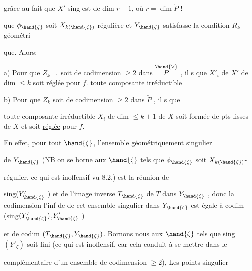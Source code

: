 

grâce au fait que $\underline{X'}$ sing est de dim $r-1$, où $r=\dim \check{P}$ !

que $\phi_{\hand{\zeta}}$ soit $X_{k(\hand{\zeta})}$-régulière et $Y_{\hand{\zeta}}$ satisfasse la condition $R_k$ géométri-%

que. Alors:

a) Pour que $Z_{k-1}$ soit de codimension $\geq 2$ dans $\overset{\hand{\vee}}{P}$ , il  s que
$X'_i$ de $X'$ de dim $\leq k$ soit \uline{réglée} pour $f$. 
toute composante irréductible 

b) Pour que $Z_k$ soit de codimension $\geq 2$ dans $\check{P}$ , il  s que

toute composante irréductible 
$X_i$ de dim $\leq k+1$ de $X$ soit formée de pts lisses de $X$ et soit \uline{réglée} pour $f$.


 

En effet, pour tout $\hand{\zeta}$, l'ensemble géométriquement singulier

de $Y_{\hand{\zeta}}$  (NB on se borne aux $\hand{\zeta}$ tels que $\phi_{\hand{\zeta}}$ soit $X_{k(\hand{\zeta})}$-

régulier, ce qui est inoffensif vu 8.2.) est la réunion de

sing$(Y'_{\hand{\zeta}}$ ) et de l'image inverse $T_{\hand{\zeta}}$ de $T$ dans $Y_{\hand{\zeta}}$ , donc la codimension
l'inf de
de cet ensemble singulier dans $Y_{\hand{\zeta}}$ est égale à \hand{(}codim (sing$(Y'_{\hand{\zeta}})$,$Y'_{\hand{\zeta}}$ )

et de codim $(T_{\hand{\zeta}},Y_{\hand{\zeta}})$. Bornons nous aux $\hand{\zeta}$ tels que \hand{)}
\placedmargin{$*$} sing$(Y'_\zeta)$ soit fini
\hand{/}(ce qui est inoffensif, car  cela conduit à se mettre dans le

complémentaire d'un ensemble de codimension $\geq 2$\hand{\unsure{$\zeta$}$\}$}), Les points singulier


